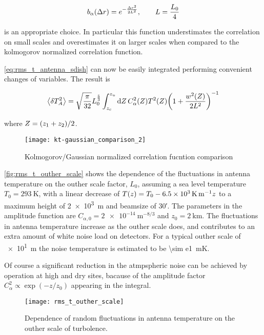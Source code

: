 \begin{equation}
        b_\alpha\qty(\Delta r) = e^{-\frac{\Delta r^2}{2L^2}},
        \qquad L = \frac{L_0}{4}
\end{equation}

is an appropriate choice. In particular this function understimates the
correlation on small scales and overestimates it on larger scales when
compared to the kolmogorov normalized correlation function.

\autoref{eq:rms_t_antenna_sdish} can now be easily integrated performing
convenient changes of variables. The result is

\begin{equation}
        \expval{\var{T^2_A}} = \sqrt{\frac{\pi}{32}} L^\frac{5}{3}_0
        \int^{z_u}_{z_c} \dd{Z} C^2_\alpha\qty(Z) T^2\qty(Z)
        \qty(1 + \frac{w^2\qty(Z)}{2L^2})^{-1}
\end{equation}

where $Z = \qty(z_1 + z_2)/2$.

\begin{figure}
        \centering
        \texttt{[image: kt-gaussian\_comparison\_2]}
        \caption{Kolmogorov/Gaussian normalized correlation fucntion
        comparison}
        \label{fig:kt-gaussian_comparison_2}
\end{figure}

\autoref{fig:rms_t_outher_scale} shows the dependence of the fluctuations
in antenna temperature on the outher scale factor, $L_0$, assuming a sea
level temperature $T_0 = \SI{293}{\kelvin}$, with a linear decrease of $T\qty(z)
= T_0 - \SI{6.5e3}{\kelvin\per\meter}z$ to a maximum height of
\SI{2e3}{\meter} and beamsize of
\ang{;30;}. The parameters in the amplitude function are $C_{\alpha,0}
= \SI{2e-14}{\meter^{-8/3}}$ and $z_0 = \SI{2}{\kilo\meter}$. The fluctuations
in antenna temperature increase as the outher scale does, and
contributes to an extra amount of white noise load on detectors. For a
typical outher scale of \SI{e1}{\meter} the noise temperature is estimated
to be \SI{\sim e1}{\milli\kelvin}.

Of course a significant reduction in the atmpspheric
noise can be achieved by operation
at high and dry sites, bacause of the amplitude factor $C^2_\alpha \propto
\exp(-z/z_0)$ appearing in the integral.

\begin{figure}
        \centering
        \texttt{[image: rms\_t\_outher\_scale]}
        \caption{Dependence of random fluctuations in antenna temperature
        on the outher scale of turbolence.}
        \label{fig:rms_t_outher_scale}
\end{figure}

